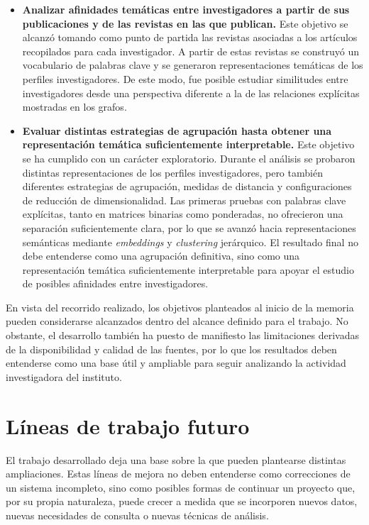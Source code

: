 \documentclass[11pt,spanish,listoffigures,listoftables]{tfgetsinf}
\begin{document}
\begin{itemize}
    \item \textbf{Analizar afinidades temáticas entre investigadores a partir de sus publicaciones y de las revistas en las que publican.} Este objetivo se alcanzó tomando como punto de partida las revistas asociadas a los artículos recopilados para cada investigador. A partir de estas revistas se construyó un vocabulario de palabras clave y se generaron representaciones temáticas de los perfiles investigadores. De este modo, fue posible estudiar similitudes entre investigadores desde una perspectiva diferente a la de las relaciones explícitas mostradas en los grafos.

    \item \textbf{Evaluar distintas estrategias de agrupación hasta obtener una representación temática suficientemente interpretable.} Este objetivo se ha cumplido con un carácter exploratorio. Durante el análisis se probaron distintas representaciones de los perfiles investigadores, pero también diferentes estrategias de agrupación, medidas de distancia y configuraciones de reducción de dimensionalidad. Las primeras pruebas con palabras clave explícitas, tanto en matrices binarias como ponderadas, no ofrecieron una separación suficientemente clara, por lo que se avanzó hacia representaciones semánticas mediante \textit{embeddings} y \textit{clustering} jerárquico. El resultado final no debe entenderse como una agrupación definitiva, sino como una representación temática suficientemente interpretable para apoyar el estudio de posibles afinidades entre investigadores.
\end{itemize}

En vista del recorrido realizado, los objetivos planteados al inicio de la memoria pueden considerarse alcanzados dentro del alcance definido para el trabajo. No obstante, el desarrollo también ha puesto de manifiesto las limitaciones derivadas de la disponibilidad y calidad de las fuentes, por lo que los resultados deben entenderse como una base útil y ampliable para seguir analizando la actividad investigadora del instituto.

\section{Líneas de trabajo futuro}

El trabajo desarrollado deja una base sobre la que pueden plantearse distintas ampliaciones. Estas líneas de mejora no deben entenderse como correcciones de un sistema incompleto, sino como posibles formas de continuar un proyecto que, por su propia naturaleza, puede crecer a medida que se incorporen nuevos datos, nuevas necesidades de consulta o nuevas técnicas de análisis.
\end{document}

